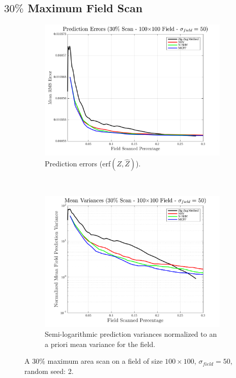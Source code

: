 \FloatBarrier
\clearpage
\subsection{$30\%$ Maximum Field Scan}
\begin{figure}[htb!]
    \centering
    \begin{subfigure}[t]{0.65\textwidth}
        \centering
        \includegraphics[width=\linewidth]{figures/hbresults/pred_errs_30p_100x100_sf_50_seed_2.png}
        \captionsetup{skip=0.20\baselineskip,size=footnotesize}
        \caption{Prediction errors (erf$(Z,\hat{Z})$).}
        \label{fig:prederrs_sigma50_p30_s2}
    \end{subfigure}%
    \\
    \begin{subfigure}[t]{0.65\textwidth}
        \centering
        \includegraphics[width=\linewidth]{figures/hbresults/vars_30p_100x100_sf_50_seed_2.png}
        \captionsetup{skip=0.20\baselineskip,size=footnotesize}
        \caption{Semi-logarithmic prediction variances normalized to an a priori mean variance for the field.}
        \label{fig:prederrs_sigma50_p30_s2}
    \end{subfigure}
    \captionsetup{skip=0.20\baselineskip}
    \caption{A $30\%$ maximum area scan on a field of size $100 \times 100$, $\sigma_{field} = 50$, random seed: 2.}
    \label{fig:sigma50_p30_s2}
\end{figure}


